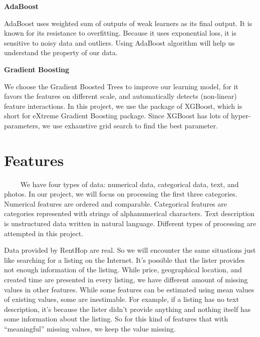 \documentclass{article}
\begin{document}
\noindent\textbf{\large AdaBoost}

AdaBoost uses weighted sum of outputs of weak learners as its final output. It is known for its resistance to overfitting. Because it uses exponential loss, it is sensitive to noisy data and outliers. Using AdaBoost algorithm will help us understand the property of our data.
\vspace{1.5em}

\noindent\textbf{\large Gradient Boosting}

We choose the Gradient Boosted Trees to improve our learning model, for it favors the features on different scale, and automatically detects (non-linear) feature interactions. In this project, we use the package of XGBoost, which is short for eXtreme Gradient Boosting package. Since XGBoost has lots of hyper-parameters, we use exhaustive grid search to find the best parameter. %
\vspace{1.5em}

\section{Features} \label{features}


~~~~ We have four types of data: numerical data, categorical data, text, and photos. In our project, we will focus on processing the first three categories. Numerical features are ordered and comparable. Categorical features are categories represented with strings of alphanumerical characters. Text description is unstructured data written in natural language. Different types of processing are attempted in this project. 

Data provided by RentHop are real. So we will encounter the same situations just like searching for a listing on the Internet. It's possible that the lister provides not enough information of the listing. While price, geographical location, and created time are presented in every listing, we have different amount of missing values in other features. While some features can be estimated using mean values of existing values, some are inestimable. For example, if a listing has no text description, it's because the lister didn't provide anything and nothing itself has some information about the listing. So for this kind of features that with ``meaningful'' missing values, we keep the value missing. 
\end{document}
